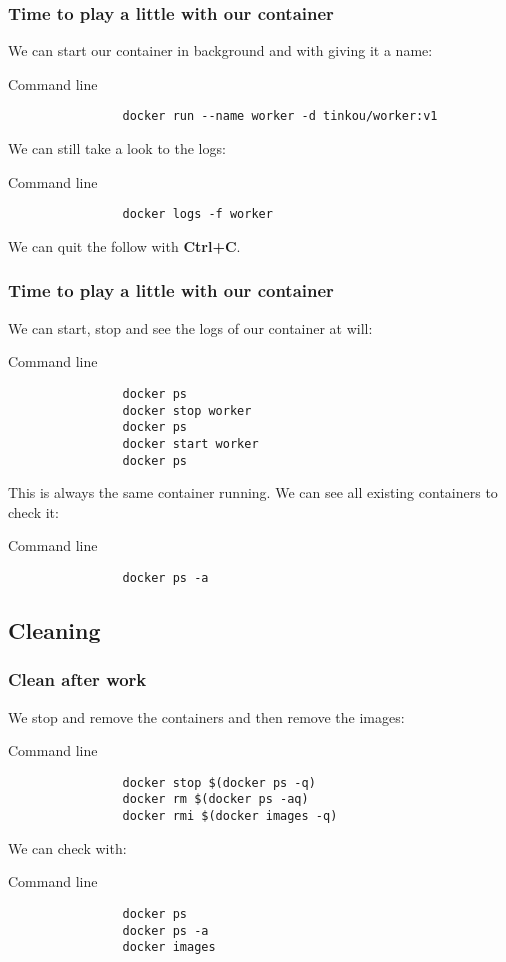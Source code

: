 	\begin{frame}[fragile]
		\frametitle{Time to play a little with our container}
		
		We can start our container in background and with giving it a name:
		\begin{block}{Command line}
			\begin{verbatim}
				docker run --name worker -d tinkou/worker:v1
			\end{verbatim}
		\end{block}
		
		\bigskip
		We can still take a look to the logs:
		\begin{block}{Command line}
			\begin{verbatim}
				docker logs -f worker
			\end{verbatim}
		\end{block}
		We can quit the follow with \textbf{Ctrl+C}.

	\end{frame}
	
	\begin{frame}[fragile]
		\frametitle{Time to play a little with our container}
		
		We can start, stop and see the logs of our container at will:
		\begin{block}{Command line}
			\begin{verbatim}
				docker ps
				docker stop worker
				docker ps
				docker start worker
				docker ps
			\end{verbatim}
		\end{block}
		
		\bigskip
		This is always the same container running. We can see all existing containers to check it:
		\begin{block}{Command line}
			\begin{verbatim}
				docker ps -a
			\end{verbatim}
		\end{block}

	\end{frame}
	
\subsection{Cleaning}	
	
	\begin{frame}[fragile]
		\frametitle{Clean after work}
		
		We stop and remove the containers and then remove the images:
		\begin{block}{Command line}
			\begin{verbatim}
				docker stop $(docker ps -q)
				docker rm $(docker ps -aq)
				docker rmi $(docker images -q)
			\end{verbatim}
		\end{block}
				
		\bigskip
		We can check with:
		\begin{block}{Command line}
			\begin{verbatim}
				docker ps
				docker ps -a
				docker images
			\end{verbatim}
		\end{block}

	\end{frame}